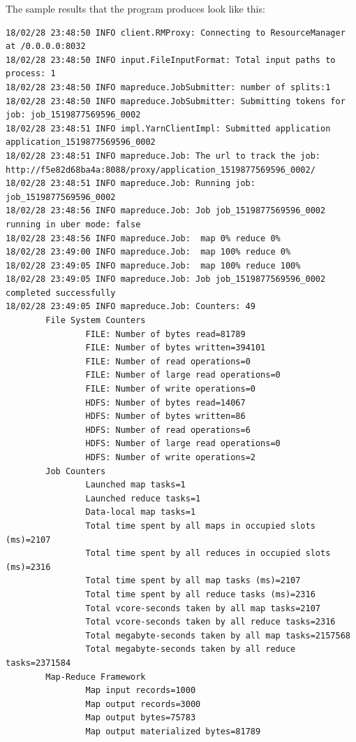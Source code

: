 The sample results that the program produces look like this:

\begin{lstlisting}
18/02/28 23:48:50 INFO client.RMProxy: Connecting to ResourceManager at /0.0.0.0:8032
18/02/28 23:48:50 INFO input.FileInputFormat: Total input paths to process: 1
18/02/28 23:48:50 INFO mapreduce.JobSubmitter: number of splits:1
18/02/28 23:48:50 INFO mapreduce.JobSubmitter: Submitting tokens for job: job_1519877569596_0002
18/02/28 23:48:51 INFO impl.YarnClientImpl: Submitted application application_1519877569596_0002
18/02/28 23:48:51 INFO mapreduce.Job: The url to track the job: http://f5e82d68ba4a:8088/proxy/application_1519877569596_0002/
18/02/28 23:48:51 INFO mapreduce.Job: Running job: job_1519877569596_0002
18/02/28 23:48:56 INFO mapreduce.Job: Job job_1519877569596_0002 running in uber mode: false
18/02/28 23:48:56 INFO mapreduce.Job:  map 0% reduce 0%
18/02/28 23:49:00 INFO mapreduce.Job:  map 100% reduce 0%
18/02/28 23:49:05 INFO mapreduce.Job:  map 100% reduce 100%
18/02/28 23:49:05 INFO mapreduce.Job: Job job_1519877569596_0002 completed successfully
18/02/28 23:49:05 INFO mapreduce.Job: Counters: 49
        File System Counters
                FILE: Number of bytes read=81789
                FILE: Number of bytes written=394101
                FILE: Number of read operations=0
                FILE: Number of large read operations=0
                FILE: Number of write operations=0
                HDFS: Number of bytes read=14067
                HDFS: Number of bytes written=86
                HDFS: Number of read operations=6
                HDFS: Number of large read operations=0
                HDFS: Number of write operations=2
        Job Counters
                Launched map tasks=1
                Launched reduce tasks=1
                Data-local map tasks=1
                Total time spent by all maps in occupied slots (ms)=2107
                Total time spent by all reduces in occupied slots (ms)=2316
                Total time spent by all map tasks (ms)=2107
                Total time spent by all reduce tasks (ms)=2316
                Total vcore-seconds taken by all map tasks=2107
                Total vcore-seconds taken by all reduce tasks=2316
                Total megabyte-seconds taken by all map tasks=2157568
                Total megabyte-seconds taken by all reduce tasks=2371584
        Map-Reduce Framework
                Map input records=1000
                Map output records=3000
                Map output bytes=75783
                Map output materialized bytes=81789

\end{lstlisting}
